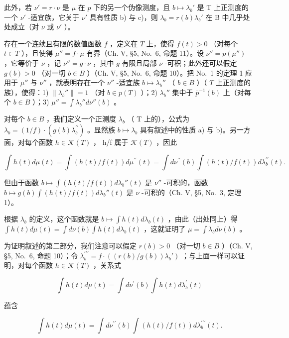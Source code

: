 此外，若 \(\nu' = r \cdot \nu\) 是 \(\mu\) 在 \(p\) 下的另一个伪像测度，且 \(b \mapsto \lambda_b'\) 是 T 上正测度的一个 \(\nu'\) -适宜族，它关于 \(\nu'\) 具有性质 b) 与 c)，则 \(\lambda_b = r(b)\lambda_b'\) 在 B 中几乎处处成立（对 \(\nu\) 或 \(\nu'\) ）。

存在一个连续且有限的数值函数 \(f\) ，定义在 \(T\) 上，使得 \(f(t) > 0\) （对每个 \(t \in T\) ），且使得 \(\mu'' = f \cdot \mu\) 有界（Ch. V, §5, No.~6, 命题 11）。设 \(\nu'' = p(\mu'')\) ，它等价于 \(\nu\) ，记 \(\nu'' = g \cdot \nu\) ，其中 \(g\) 有限且局部 \(\nu\) -可积；此外还可以假定 \(g(b) > 0\) （对一切 \(b \in B\) ）（Ch. V, §5, No.~6, 命题 10）。把 No.~1 的定理 1 应用于 \(\mu''\) 与 \(\nu''\) ，就表明存在一个 \(\nu''\) -适宜族 \(b \mapsto \lambda_b''\) （ \(b \in B\) ）（ \(T\) 上正测度的族），使得：1) \(\| \lambda_b'' \| = 1\) （对 \(b \in p(T)\) ）；2) \(\lambda_b''\) 集中于 \(\overline{p}^{-1}(b)\) 上（对每个 \(b \in B\) ）；3) \(\mu'' = \int \lambda_b'' d\nu''(b)\) 。

对每个 \(b \in B\) ，我们定义一个正测度 \(\lambda_{b}\) （ T 上的），公式为 \(\lambda_{b} = (1/f) \cdot (g(b)\lambda_{b}^{\prime\prime})\) 。显然族 \(b \mapsto \lambda_{b}\) 具有叙述中的性质 a) 与 b)。另一方面，对每个函数 \(h \in \mathcal{K}(T)\) ， h/f 属于 \(\mathcal{K}(T)\) ，因此

\[
\int h (t) d \mu (t) = \int \left(h (t) / f (t)\right) d \mu^ {\prime \prime} (t) = \int d \nu^ {\prime \prime} (b) \int \left(h (t) / f (t)\right) d \lambda_ {b} ^ {\prime \prime} (t).
\]

但由于函数 \(b \mapsto \int (h(t) / f(t)) d\lambda_b''(t)\) 是 \(\nu''\) -可积的，函数 \(b \mapsto g(b) \int (h(t) / f(t)) d\lambda_b''(t)\) 是 \(\nu\) -可积的（Ch. V, §5, No.~3, 定理 1）。

根据 \(\lambda_b\) 的定义，这个函数就是 \(b \mapsto \int h(t) d\lambda_b(t)\) ，由此（出处同上）得 \(\int h(t) d\mu(t) = \int d\nu(b) \int h(t) d\lambda_b(t)\) ，这就证明了 \(\mu = \int \lambda_b d\nu(b)\) 。

为证明叙述的第二部分，我们注意可以假定 \(r(b) > 0\) （对一切 \(b \in B\) ）（Ch. V, §5, No.~6, 命题 10）；令 \(\lambda_b^{\prime \prime \prime} = f \cdot \left( \left( r(b) / g(b) \right) \lambda_b' \right)\) ；与上面一样可以证明，对每个函数 \(h \in \mathcal{K}(T)\) ，关系式

\[
\int h (t) d \mu (t) = \int d \nu^ {\prime} (b) \int h (t) d \lambda_ {b} ^ {\prime} (t)
\]

蕴含

\[
\int h (t) d \mu (t) = \int d \nu^ {\prime \prime} (b) \int \left(h (t) / f (t)\right) d \lambda_ {b} ^ {\prime \prime \prime} (t).
\]

